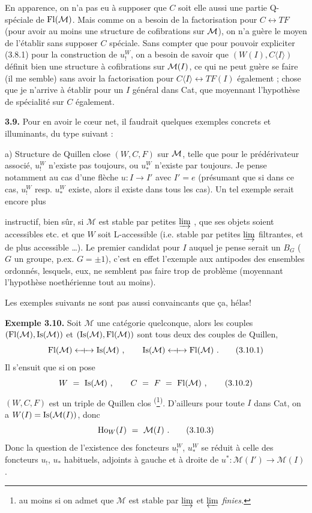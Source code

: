 En apparence, on n'a pas eu à supposer que $C$ soit elle aussi une partie Q-spéciale de $\mathrm{Fl}(\mathcal{M})$. Mais comme on a besoin de la factorisation pour $C\longleftrightarrow TF$ (pour avoir au moins une structure de cofibrations sur $\mathcal{M}$), on n'a guère le moyen de l'établir sans supposer $C$ spéciale. Sans compter que pour pouvoir expliciter (3.8.1) pour la construction de $u^{W}_{!}$, on a besoin de savoir que $(W(I),C\langle I\rangle)$ définit bien une structure à cofibrations sur $\mathcal{M}(I)$, ce qui ne peut guère se faire (il me semble) sans avoir la factorisation pour $C\langle I\rangle\longleftrightarrow TF(I)$ également ; chose que je n'arrive à établir pour un $I$ général dans Cat, que moyennant l'hypothèse de spécialité sur $C$ également.

\textbf{3.9.} Pour en avoir le cœur net, il faudrait quelques exemples concrets et illuminants, du type suivant :

a) Structure de Quillen close $(W,C,F)$ sur $\mathcal{M}$, telle que pour le prédérivateur associé, $u^{W}_{!}$ n'existe pas toujours, ou $u^{W}_{*}$ n'existe par toujours. Je pense notamment au cas d'une flèche $u : I\longrightarrow I'$ avec $I'=e$ (présumant que si dans ce cas, $u^{W}_{!}$ resp. $u^{W}_{*}$ existe, alors il existe dans tous les cas). Un tel exemple serait encore plus %

instructif, bien sûr, si $\mathcal{M}$ est stable par petites $\varinjlim$ , que ses objets soient accessibles etc. et que $W$ soit L-accessible (i.e. stable par petites $\varinjlim$ filtrantes, et de plus accessible \dots). Le premier candidat pour $I$ auquel je pense serait un $B_G$ ($G$ un groupe, p.ex. $G=\pm1$), c'est en effet l'exemple aux antipodes des ensembles ordonnés, lesquels, eux, ne semblent pas faire trop de problème (moyennant l'hypothèse noethérienne tout au moins).

Les exemples suivants ne sont pas aussi convaincants que ça, hélas!

\textbf{Exemple 3.10.} Soit $\mathcal{M}$ une catégorie quelconque, alors les couples $(\mathrm{Fl}(\mathcal{M}),\mathrm{Is}(\mathcal{M}))$ et $(\mathrm{Is}(\mathcal{M}),\mathrm{Fl}(\mathcal{M}))$ sont tous deux des couples de Quillen,
\[
\Fl(\mathcal{M}) \Qcouple \Is(\mathcal{M}) \ , \qquad \Is(\mathcal{M}) \Qcouple \Fl(\mathcal{M}) \ . \tag*{(3.10.1)} %
\]
Il s'ensuit que si on pose
\[
W \ = \ \Is(\mathcal{M}) \ , \qquad C \ = \ F \ = \ \Fl(\mathcal{M}) \ , \tag*{(3.10.2)}
\]
$(W,C,F)$ est un triple de Quillen clos \textsuperscript{(}\footnote[22]{au moins si on admet que $\mathcal{M}$ est stable par $\varinjlim$ et $\varprojlim$ \textit{finies.}}\textsuperscript{)}. D'ailleurs pour toute $I$ dans Cat, on a $W(I)=\mathrm{Is}(\mathcal{M}(I))$, donc
\[
\Ho_W(I) \ = \ \mathcal{M}(I) \ . \tag*{(3.10.3)}
\]
Donc la question de l'existence des foncteurs $u_!^W$, $u_*^W$ se réduit à celle des foncteurs $u_!$, $u_*$ habituels, adjoints à gauche et à droite de $u^* : \mathcal{M}(I') \longrightarrow \mathcal{M}(I)$.

